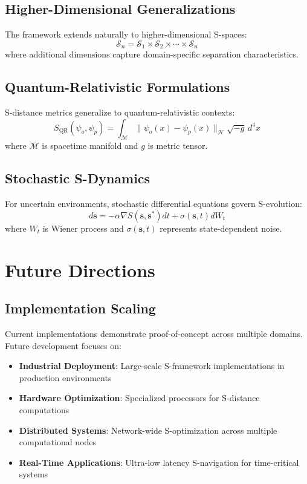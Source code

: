 \documentclass[11pt]{article}
\begin{document}
\subsection{Higher-Dimensional Generalizations}

The framework extends naturally to higher-dimensional S-spaces:
\begin{equation}
\mathcal{S}_n = \mathcal{S}_1 \times \mathcal{S}_2 \times \cdots \times \mathcal{S}_n
\end{equation}
where additional dimensions capture domain-specific separation characteristics.

\subsection{Quantum-Relativistic Formulations}

S-distance metrics generalize to quantum-relativistic contexts:
\begin{equation}
S_{\text{QR}}(\psi_o, \psi_p) = \int_{\mathcal{M}} \|\psi_o(x) - \psi_p(x)\|_{\mathcal{H}} \sqrt{-g} \, d^4x
\end{equation}
where $\mathcal{M}$ is spacetime manifold and $g$ is metric tensor.

\subsection{Stochastic S-Dynamics}

For uncertain environments, stochastic differential equations govern S-evolution:
\begin{equation}
d\mathbf{s} = -\alpha \nabla S(\mathbf{s}, \mathbf{s}^*) dt + \sigma(\mathbf{s}, t) dW_t
\end{equation}
where $W_t$ is Wiener process and $\sigma(\mathbf{s}, t)$ represents state-dependent noise.

\section{Future Directions}

\subsection{Implementation Scaling}

Current implementations demonstrate proof-of-concept across multiple domains. Future development focuses on:

\begin{itemize}
\item \textbf{Industrial Deployment}: Large-scale S-framework implementations in production environments
\item \textbf{Hardware Optimization}: Specialized processors for S-distance computations
\item \textbf{Distributed Systems}: Network-wide S-optimization across multiple computational nodes
\item \textbf{Real-Time Applications}: Ultra-low latency S-navigation for time-critical systems
\end{itemize}
\end{document}
